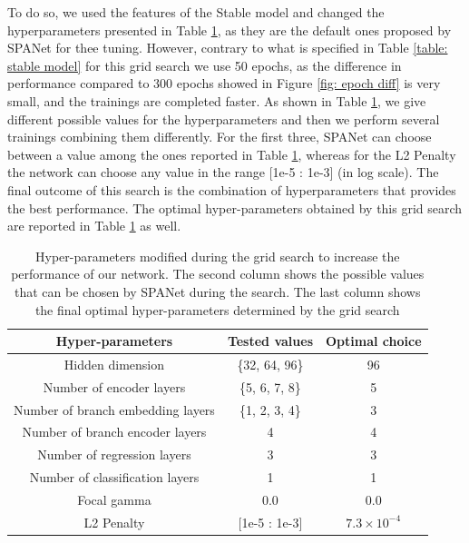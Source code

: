 To do so, we used the features of the Stable model and changed the hyperparameters presented in Table \ref{table: parameters for the grid search}, as they are the default ones proposed by SPANet for thee tuning. 
However, contrary to what is specified in Table \ref{table: stable model} for this grid search we use 50 epochs, as the difference in performance compared to 300 epochs showed in Figure \ref{fig: epoch diff} is very small, and the trainings are completed faster.
As shown in Table \ref{table: parameters for the grid search}, we give different possible values for the hyperparameters and then we perform several trainings combining them differently.
For the first three, SPANet can choose between a value among the ones reported in Table \ref{table: parameters for the grid search}, whereas for the L2 Penalty the network can choose any value in the range [1e-5 : 1e-3] (in log scale).
The final outcome of this search is the combination of hyperparameters that provides the best performance.  The optimal hyper-parameters obtained by this grid search are reported in Table \ref{table: parameters for the grid search} as well.

\begin{table}[hbt]
   \centering
   \begin{tabular}{|c|c|c|}
   \hline
    Hyper-parameters  &  Tested values & Optimal choice \\
    \hline
    Hidden dimension  &  \{32, 64, 96\} & 96 \\
    \hline
   Number of encoder layers & \{5, 6, 7, 8\} & 5 \\
    \hline
    Number of branch embedding layers &  \{1, 2, 3, 4\} & 3 \\
    \hline
     Number of branch encoder layers & 4 & 4\\
    \hline
    Number of regression layers & 3 & 3 \\
    \hline
    Number of classification layers & 1 & 1\\
    \hline
    Focal gamma & 0.0 & 0.0 \\
    \hline
    L2 Penalty & [1e-5 : 1e-3] & $7.3\times 10^{-4}$ \\
    \hline
   \end{tabular}
   \caption{Hyper-parameters modified during the grid search to increase the performance of our network. The second column shows the possible values that can be chosen by SPANet during the search. The last column shows the final optimal hyper-parameters determined by the grid search}
   \label{table: parameters for the grid search}
\end{table}

